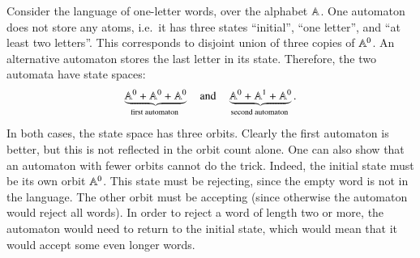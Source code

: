 {
    Consider the language of one-letter words, over the alphabet $\mathbb A$. One automaton does not store any atoms, i.e.~it has three states ``initial'', ``one letter'', and ``at least two letters''. This corresponds to disjoint union of three copies of $\mathbb A^0$. 
    An alternative automaton stores the last letter in its state. Therefore, the two automata have state spaces: 
    \begin{align}
        \myunderbrace{\atoms^0 + \atoms^0 + \atoms^0}{first automaton}
        \quad \text{and} \quad
        \myunderbrace{\atoms^0 + \atoms^1 + \atoms^0}{second automaton}.
    \end{align}
    In both cases, the state space has three orbits. Clearly the first automaton is better, but this is not reflected in the orbit count alone. One can also show that an automaton with fewer orbits cannot do the trick. Indeed, the initial state must be its own orbit $\mathbb A^0$. This state must be rejecting, since the empty word is not in the language. The other orbit must be accepting (since otherwise the automaton would reject all words). In order to reject a word of length two or more, the automaton would need to return to the initial state, which would mean that it would accept some even longer words.
}


